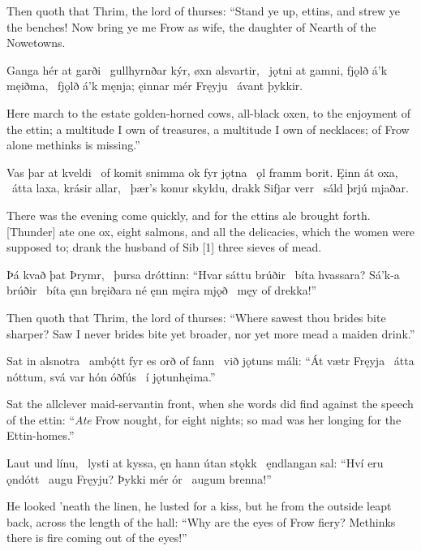 Then quoth that Thrim, the lord of thurses: “Stand ye up, ettins, and strew ye the benches! Now bring ye me Frow as wife, the daughter of Nearth of the Nowetowns.

Ganga hér at garði \hld\ gullhyrnðar kýr,
øxn alsvartir, \hld\ jǫtni at gamni,
fjǫlð á’k męiðma, \hld\ fjǫlð á’k męnja;
ęinnar mér Fręyju \hld\ ávant þykkir.

Here march to the estate golden-horned cows, all-black oxen, to the enjoyment of the ettin; a multitude I own of treasures, a multitude I own of necklaces; of Frow alone methinks is missing.”

Vas þar at kveldi \hld\ of komit snimma
ok fyr jǫtna \hld\ ǫl framm borit.
Ęinn át oxa, \hld\ átta laxa,
krásir allar, \hld\ þær’s konur skyldu,
drakk Sifjar verr \hld\ sáld þrjú mjaðar.

There was the evening come quickly, and for the ettins ale brought forth. [Thunder] ate one ox, eight salmons, and all the delicacies, which the women were supposed to; drank the husband of Sib [1] three sieves of mead.

Þá kvað þat Þrymr, \hld\ þursa dróttinn:
“Hvar sáttu brúðir \hld\ bíta hvassara?
Sá’k-a brúðir \hld\ bíta ęnn bręiðara
né ęnn męira mjǫð \hld\ męy of drekka!”

Then quoth that Thrim, the lord of thurses: “Where sawest thou brides bite sharper? Saw I never brides bite yet broader, nor yet more mead a maiden drink.”

Sat in alsnotra \hld\ ambǫ́tt fyr
es orð of fann \hld\ við jǫtuns máli:
“Át vætr Fręyja \hld\ átta nóttum,
svá var hón óðfús \hld\ í jǫtunhęima.”

Sat the allclever maid-servant\footnotemark[1] in front, when she words did find against the speech of the ettin: “\emph{Ate} Frow nought, for eight nights; so mad was her longing for the Ettin-homes.\footnotemark[2]”

Laut und línu, \hld\ lysti at kyssa,
ęn hann útan stǫkk \hld\ ęndlangan sal:
“Hví eru ǫndótt \hld\ augu Fręyju?
Þykki mér ór \hld\ augum brenna!”

He looked ’neath the linen, he lusted for a kiss, but he from the outside leapt back, across the length of the hall: “Why are the eyes of Frow fiery? Methinks there is fire coming out of the eyes!\footnotemark[1]”

